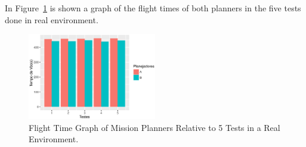 \documentclass[conference,harvard,brazil,english]{sbatex}
\begin{document}
	\begin{table}[H]
\centering
{}
\caption{Mission Planners Flight Time - Real.\label{table:plannersReal}}
\end{table}

In Figure~\ref{fig:GraPlannersReal} is shown a graph of the flight times of both planners in the five tests done in real environment.

\begin{figure}[H]
	\centering
	\includegraphics[width=0.5\textwidth]{GraPlannersReal.eps}
	\caption{Flight Time Graph of Mission Planners Relative to 5 Tests in a Real Environment.\label{fig:GraPlannersReal}}
	\end{figure}
	
\end{document}
